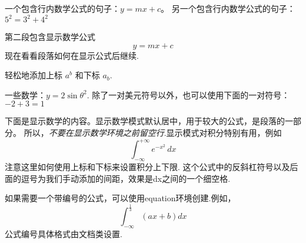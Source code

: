 \documentclass{article}
\begin{document}
一个包含行内数学公式的句子：$y = mx + c$。
另一个包含行内数学公式的句子：$5^{2}=3^{2}+4^{2}$

第二段包含显示数学公式
\[
    y = mx + c
\]
现在看看段落如何在显示公式后继续.

轻松地添加上标 $a^{b}$ 和下标 $a_{b}$.

一些数学：$y= 2 \sin \theta^{2}$. 除了一对美元符号以外，也可以使用下面的一对符号：
\(-2 + 3 = 1\)

下面是显示数学的内容。显示数学模式默认居中，用于较大的公式，是段落的一部分。
所以，\emph{不要在显示数学环境之前留空行}.显示模式对积分特别有用，例如
\[
\int_{-\infty}^{+\infty} e^{-x^2} \, dx
\]注意这里如何使用上标和下标来设置积分上下限.
这个公式中的反斜杠符号以及后面的逗号为我们手动添加的间距，效果是dx之间的一个细空格.

如果需要一个带编号的公式，可以使用equation环境创建.例如，
\begin{equation}
\int_{-\infty}^{\frac{1}{3} } (a x + b) dx 
\end{equation}
公式编号具体格式由文档类设置.
\end{document}
